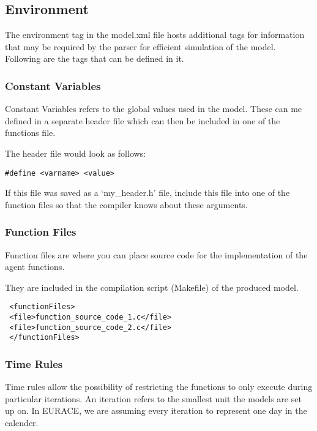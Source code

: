 \subsection{Environment}
The environment tag in the model.xml file hosts additional tags for information that may be required by
the parser for efficient simulation of the model.
Following are the tags that can be defined in it.


\subsubsection{Constant Variables}

Constant Variables refers to the global values used in the model.
These can me defined in a separate header file which can then be included in one of the functions file.

The header file would look as follows:

\begin{mylisting}
\begin{verbatim}
#define <varname> <value>
\end{verbatim}
\end{mylisting}

If this file was saved as a `my\_header.h' file, include this file into one of
the function files so that the compiler knows about these arguments.

\subsubsection{Function Files}

Function files are where you can place source code for the implementation of the agent functions.

They are included in the compilation script (Makefile) of the produced model.

\begin{mylisting}
\begin{verbatim}
 <functionFiles>
 <file>function_source_code_1.c</file>
 <file>function_source_code_2.c</file>
 </functionFiles>
\end{verbatim}
\end{mylisting}

\subsubsection{Time Rules}\label{timeunit}

Time rules allow the possibility of restricting the functions to
only execute during particular iterations. An iteration refers to
the smallest unit the models are set up on. In EURACE, we are
assuming every iteration to represent one day in the calender.


